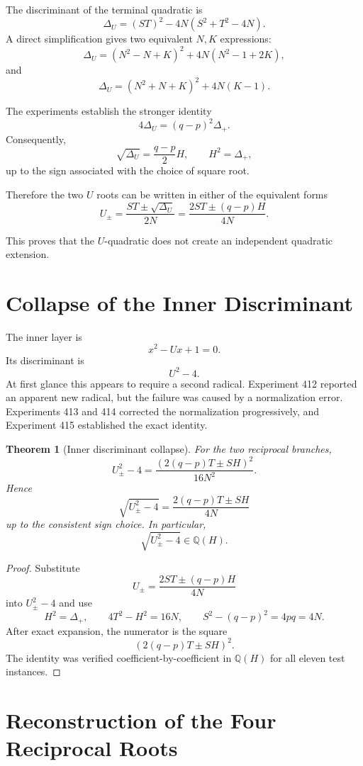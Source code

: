 \documentclass[11pt,a4paper]{article}
\newtheorem{theorem}{Theorem}[section]
\theoremstyle{definition}
\theoremstyle{remark}
\newcommand{\Q}{\mathbb{Q}}
\begin{document}
The discriminant of the terminal quadratic is
\[
\Delta_U
=(ST)^2-4N(S^2+T^2-4N).
\]
A direct simplification gives two equivalent $N,K$ expressions:
\[
\boxed{
\Delta_U=(N^2-N+K)^2+4N(N^2-1+2K),
}
\]
and
\[
\boxed{
\Delta_U=(N^2+N+K)^2+4N(K-1).
}
\]

The experiments establish the stronger identity
\[
\boxed{
4\Delta_U=(q-p)^2\Delta_+.
}
\]
Consequently,
\[
\sqrt{\Delta_U}
=\frac{q-p}{2}H,
\qquad H^2=\Delta_+,
\]
up to the sign associated with the choice of square root.

Therefore the two $U$ roots can be written in either of the equivalent forms
\[
\boxed{
U_\pm
=\frac{ST\pm\sqrt{\Delta_U}}{2N}
=\frac{2ST\pm(q-p)H}{4N}.
}
\]

This proves that the $U$-quadratic does not create an independent quadratic extension.

\section{Collapse of the Inner Discriminant}

The inner layer is
\[
\boxed{x^2-Ux+1=0.}
\]
Its discriminant is
\[
U^2-4.
\]
At first glance this appears to require a second radical. Experiment 412 reported an apparent new radical, but the failure was caused by a normalization error. Experiments 413 and 414 corrected the normalization progressively, and Experiment 415 established the exact identity.

\begin{theorem}[Inner discriminant collapse]
For the two reciprocal branches,
\[
\boxed{
U_\pm^2-4
=\frac{\left(2(q-p)T\pm SH\right)^2}{16N^2}.
}
\]
Hence
\[
\boxed{
\sqrt{U_\pm^2-4}
=\frac{2(q-p)T\pm SH}{4N}
}
\]
up to the consistent sign choice. In particular,
\[
\sqrt{U_\pm^2-4}\in\Q(H).
\]
\end{theorem}

\begin{proof}
Substitute
\[
U_\pm=\frac{2ST\pm(q-p)H}{4N}
\]
into $U_\pm^2-4$ and use
\[
H^2=\Delta_+,
\qquad
4T^2-H^2=16N,
\qquad
S^2- (q-p)^2=4pq=4N.
\]
After exact expansion, the numerator is the square
\[
\left(2(q-p)T\pm SH\right)^2.
\]
The identity was verified coefficient-by-coefficient in $\Q(H)$ for all eleven test instances.
\end{proof}

\section{Reconstruction of the Four Reciprocal Roots}
\end{document}
